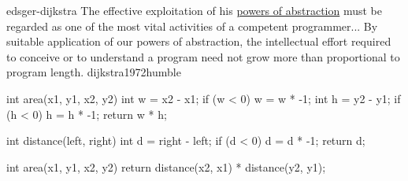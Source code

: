 \documentclass{article}
\begin{document}

\lnQuote
  {edsger-dijkstra}
  {The effective exploitation of his \ul{powers of abstraction} must be regarded as one of the most vital activities of a competent programmer... By suitable application of our powers of abstraction, the intellectual effort required to conceive or to understand a program need not grow more than proportional to program length.}
  {dijkstra1972humble}

\begin{lnSnippet}
int area(x1, y1, x2, y2) {
  int w = x2 - x1;
  if (w < 0) { w = w * -1; }
  int h = y2 - y1;
  if (h < 0) { h = h * -1; }
  return w * h;
}
\end{lnSnippet}
\begin{lnSnippet}
int distance(left, right) {
  int d = right - left;
  if (d < 0) { d = d * -1; }
  return d;
}

int area(x1, y1, x2, y2) {
  return distance(x2, x1)
    * distance(y2, y1);
}
\end{lnSnippet}
\end{document}
